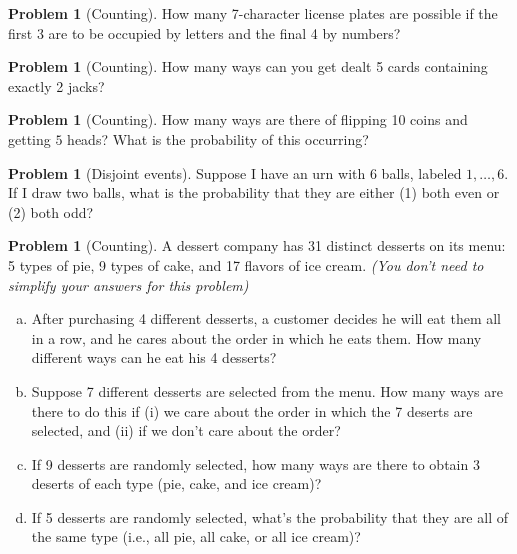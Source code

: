 \documentclass[10pt]{article}
\theoremstyle{definition}
\newtheorem{problem}[theorem]{Problem}
\newcommand{\1}[1]{\textbf{1}_{\left[#1\right]}} %
\def\P{\mathbb{P}} %
\begin{document}
\begin{problem}[Counting]
  How many 7-character license plates are possible if the first 3 are to be
  occupied by letters and the final 4 by numbers? %
\end{problem}


\begin{problem}[Counting]
  How many ways can you get dealt 5 cards containing exactly 2 jacks?
\end{problem}




\begin{problem}[Counting]
  How many ways are there of flipping 10 coins and getting $5$ heads? What is the probability of
  this occurring?
\end{problem}


\begin{problem}[Disjoint events]
  Suppose I have an urn with $6$ balls, labeled $1,\ldots,6$. If I draw two balls, what is the probability
  that they are either (1) both even or (2) both odd?
\end{problem}



\begin{problem}[Counting]
  A dessert company has 31 distinct desserts on its menu: 5 types of pie, 9 types of cake, and 17 flavors of ice
  cream. \textit{(You don't need to simplify your answers for this problem)}
  \begin{enumerate}[(a)]
    \item After purchasing 4 different desserts, a customer decides he will eat them all in a row, and he
    cares about the order in which he eats them. How many different ways can he eat his 4 desserts?
    \item Suppose 7 different desserts are selected from the menu. How many ways are there to do
    this if (i) we care about the order in which the 7 deserts are selected, and (ii) if we don't care
    about the order? 
    \item If 9 desserts are randomly selected, how many ways are there to obtain 3 deserts of each type
    (pie, cake, and ice cream)?
    \item If 5 desserts are randomly selected, what's the probability that they are all of the same
    type  (i.e., all pie, all cake, or all ice cream)?
  \end{enumerate}
\end{problem}
\end{document}
